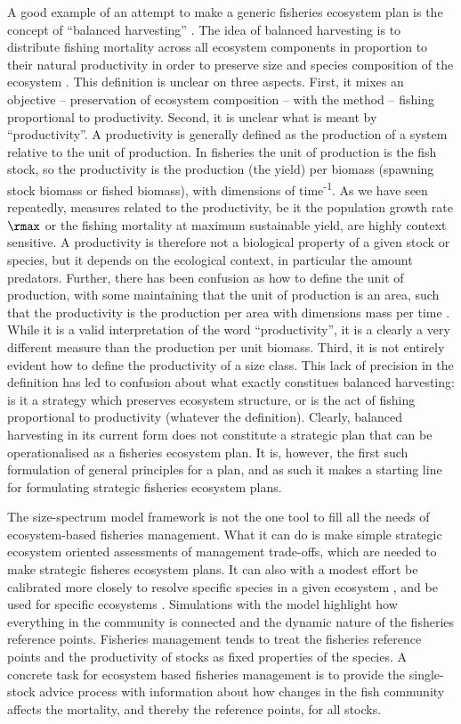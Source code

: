 A good example of an attempt to make a generic fisheries ecosystem plan is the concept of ``balanced harvesting'' \citep{Zhou2010}.  The idea of balanced harvesting is to distribute fishing mortality across all ecosystem components in proportion to their natural productivity in order to preserve size and species composition of the ecosystem \citep{Garcia2012}.  This definition is unclear on three aspects.  First, it mixes an objective -- preservation of ecosystem composition -- with the method -- fishing proportional to productivity.  Second, it is unclear what is meant by ``productivity''.  A productivity is generally defined as the production of a system relative to the unit of production. In fisheries the unit of production is the fish stock, so the productivity is the production (the yield) per biomass (spawning stock biomass or fished biomass), with dimensions of time\textsuperscript{-1}.  As we have seen repeatedly, measures related to the productivity, be it the population growth rate $\rmax$ or the fishing mortality at maximum sustainable yield, are highly context sensitive.  A productivity is therefore not a biological property of a given stock or species, but it depends on the ecological context, in particular the amount predators.  Further, there has been confusion as how to define the unit of production, with some maintaining that the unit of production is an area, such that the productivity is the production per area with dimensions mass per time \citep{Law2012, Law2013}.  While it is a valid interpretation of the word ``productivity'', it is a clearly a very different measure than the production per unit biomass.  Third, it is not entirely evident how to define the productivity of a size class.  This lack of precision in the definition has led to confusion about what exactly constitues balanced harvesting: is it a strategy which preserves ecosystem structure, or is the act of fishing proportional to productivity (whatever the definition).  Clearly, balanced harvesting in its current form does not constitute a strategic plan that can be operationalised as a fisheries ecosystem plan.  It is, however, the first such formulation of general principles for a plan, and as such it makes a starting line for formulating strategic fisheries ecosystem plans.

The size-spectrum model framework is not the one tool to fill all the needs of ecosystem-based fisheries management.  What it can do is make simple strategic ecosystem oriented assessments of management trade-offs, which are needed to make strategic fisheres ecosystem plans.  It can also with a modest effort be calibrated more closely to resolve specific species in a given ecosystem , and be used for specific ecosystems \citep{Jacobsen2017}.   Simulations with the model highlight how everything in the community is connected and the dynamic nature of the fisheries reference points.  Fisheries management tends to treat the fisheries reference points and the productivity of stocks as fixed properties of the species.  A concrete task for ecosystem based fisheries management is to provide the single-stock advice process with information about how changes in the fish community affects the mortality, and thereby the reference points, for all stocks.

